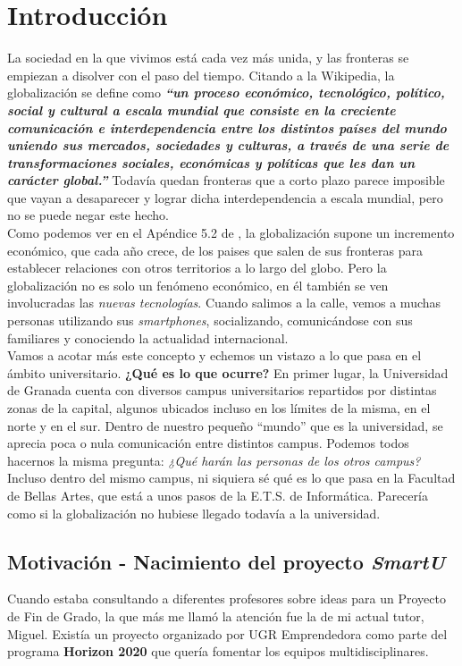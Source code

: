 \chapter{Introducción}
\label{ch:introduccion}
La sociedad en la que vivimos está cada vez más unida, y las fronteras se empiezan a disolver con el paso del tiempo. Citando a la Wikipedia, la globalización \cite{globalizacion} se define como \textbf{\textit{``un proceso económico, tecnológico, político, social y cultural a escala mundial que consiste en la creciente comunicación e interdependencia entre los distintos países del mundo uniendo sus mercados, sociedades y culturas, a través de una serie de transformaciones sociales, económicas y políticas que les dan un carácter global.''}} Todavía quedan fronteras que a corto plazo parece imposible que vayan a desaparecer y lograr dicha interdependencia a escala mundial, pero no se puede negar este hecho.\\

Como podemos ver en el Apéndice 5.2 de \cite{globalreport}, la globalización supone un incremento económico, que cada año crece, de los paises que salen de sus fronteras para establecer relaciones con otros territorios a lo largo del globo. Pero la globalización no es solo un fenómeno económico, en él también se ven involucradas las \textit{nuevas tecnologías}. Cuando salimos a la calle, vemos a muchas personas utilizando sus \textit{smartphones}, socializando, comunicándose con sus familiares y conociendo la actualidad internacional.\\

Vamos a acotar más este concepto y echemos un vistazo a lo que pasa en el ámbito universitario. \textbf{¿Qué es lo que ocurre?} En primer lugar, la Universidad de Granada cuenta con diversos campus universitarios repartidos por distintas zonas de la capital, algunos ubicados incluso en los límites de la misma, en el norte y en el sur. Dentro de nuestro pequeño ``mundo'' que es la universidad, se aprecia poca o nula comunicación entre distintos campus. Podemos todos hacernos la misma pregunta: \textit{¿Qué harán las personas de los otros campus?}\\

Incluso dentro del mismo campus, ni siquiera sé qué es lo que pasa en la Facultad de Bellas Artes, que está a unos pasos de la E.T.S. de Informática. Parecería como si la globalización no hubiese llegado todavía a la universidad.

\section{Motivación - Nacimiento del proyecto \textit{SmartU}}
Cuando estaba consultando a diferentes profesores sobre ideas para un Proyecto de Fin de Grado, la que más me llamó la atención fue la de mi actual tutor, Miguel. Existía un proyecto organizado por UGR Emprendedora \cite{ugremprende} como parte del programa \textbf{Horizon 2020} \cite{h2020} que quería fomentar los equipos multidisciplinares.\\

